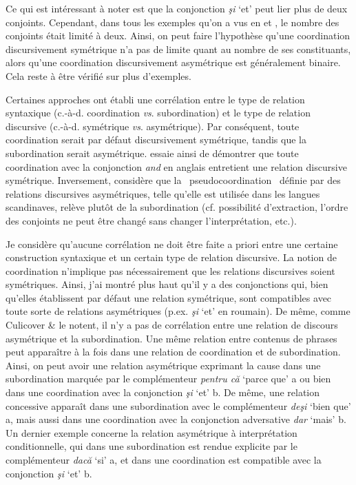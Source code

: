 Ce qui est intéressant à noter est que la conjonction \textit{şi} `et' peut lier plus de deux conjoints. Cependant, dans tous les exemples qu'on a vus en  et , le nombre des conjoints était limité à deux. Ainsi, on peut faire l'hypothèse qu'une coordination discursivement symétrique n'a pas de limite quant au nombre de ses constituants, alors qu'une coordination discursivement asymétrique est généralement binaire. Cela reste à être vérifié sur plus d'exemples.

Certaines approches ont établi une corrélation entre le type de relation syntaxique (c.-à-d. coordination \textit{vs}. subordination) et le type de relation discursive (c.-à-d. symétrique \textit{vs}. asymétrique). Par conséquent, toute coordination serait par défaut discursivement symétrique, tandis que la subordination serait asymétrique. \citet{Txurruka2000} essaie ainsi de démontrer que toute coordination avec la conjonction \textit{and} en anglais entretient une relation discursive symétrique. Inversement, \citet{Johannessen1998} considère que la {\guillemotleft}~pseudocoordination~{\guillemotright} définie par des relations discursives asymétriques, telle qu'elle est utilisée dans les langues scandinaves, relève plutôt de la subordination (cf. possibilité d'extraction, l'ordre des conjoints ne peut être changé sans changer l'interprétation, etc.).  

Je considère qu'aucune corrélation ne doit être faite a priori entre une certaine construction syntaxique et un certain type de relation discursive. La notion de coordination n'implique pas nécessairement que les relations discursives soient symétriques. Ainsi, j'ai montré plus haut qu'il y a des conjonctions qui, bien qu'elles établissent par défaut une relation symétrique, sont compatibles avec toute sorte de relations asymétriques (p.ex. \textit{şi} `et' en roumain). De même, comme Culicover \& \citet{Jackendoff2005} le notent, il n'y a pas de corrélation entre une relation de discours asymétrique et la subordination. Une même relation entre contenus de phrases peut apparaître à la fois dans une relation de coordination et de subordination. Ainsi, on peut avoir une relation asymétrique exprimant la cause dans une subordination marquée par le complémenteur \textit{pentru că} `parce que' a ou bien dans une coordination avec la conjonction \textit{şi} `et' b. De même, une relation concessive apparaît dans une subordination avec le complémenteur \textit{deşi} `bien que' a, mais aussi dans une coordination avec la conjonction adversative \textit{dar} `mais' b. Un dernier exemple concerne la relation asymétrique à interprétation conditionnelle, qui dans une subordination est rendue explicite par le complémenteur \textit{dacă} `si' a, et dans une coordination est compatible avec la conjonction \textit{şi} `et' b.


